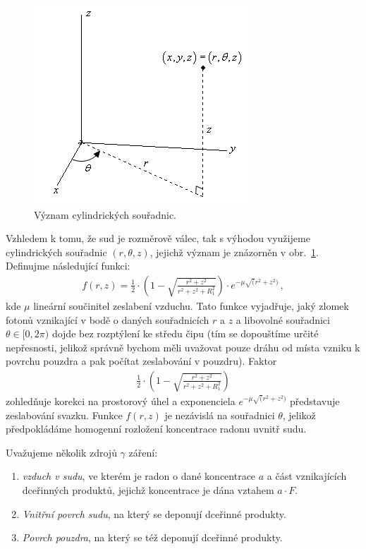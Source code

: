 \documentclass[11pt,a4paper]{article}
\begin{document}
\begin{figure}[ht]
	\centering
	\includegraphics[width=0.4\linewidth]{valcove_souradnice.png}
	\caption{Význam cylindrických souřadnic. \cite{valcovesouradnice}}
	\label{fig:valcovesouradnice}
\end{figure}
Vzhledem k tomu, že sud je rozměrově válec, tak s výhodou využijeme cylindrických souřadnic $(r,\theta, z)$, jejichž význam je znázorněn v obr.~\ref{fig:valcovesouradnice}. 
Definujme následující funkci:
\begin{align}
	f(r,z)=\frac{1}{2}\cdot\left(1-\sqrt{\frac{r^2+z^2}{r^2+z^2+R_1^2}}\right)\cdot e^{-\mu\sqrt(r^2+z^2)}\,,\label{eq:gama_geometrie}
\end{align}
kde $\mu$ lineární součinitel zeslabení vzduchu. Tato funkce vyjadřuje, jaký zlomek fotonů vznikající v bodě o daných souřadnicích $r$ a $z$ a libovolné souřadnici $\theta\in[0,2\pi)$ dojde bez rozptýlení ke středu čipu (tím se dopouštíme určité nepřesnosti, jelikož správně bychom měli uvažovat pouze dráhu od místa vzniku k povrchu pouzdra a pak počítat zeslabování v pouzdru). Faktor 
\begin{align}
	\frac{1}{2}\cdot\left(1-\sqrt{\frac{r^2+z^2}{r^2+z^2+R_1^2}}\right)
\end{align}
zohledňuje korekci na prostorový úhel a exponenciela $e^{-\mu\sqrt(r^2+z^2)}$ představuje zeslabování svazku. Funkce $f(r,z)$ je nezávislá na souřadnici $\theta$, jelikož předpokládáme homogenní rozložení koncentrace radonu uvnitř sudu.

Uvažujeme několik zdrojů $\gamma$ záření:
\begin{enumerate}
	\item \emph{vzduch v sudu}, ve kterém je radon o dané koncentrace $a$ a část vznikajících dceřinných produktů, jejichž koncentrace je dána vztahem $a\cdot F$.
	\item \emph{Vnitřní povrch sudu}, na který se deponují dceřinné produkty.
	\item \emph{Povrch pouzdra}, na který se též deponují dceřinné produkty.
	
\end{enumerate}
\end{document}
